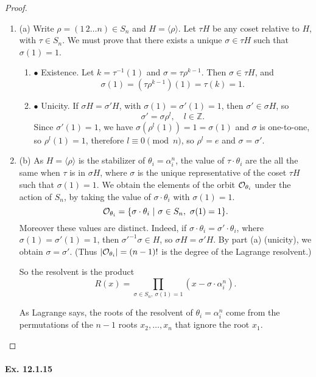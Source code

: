 \documentclass[11pt,a4paper]{article}
\newcommand{\be} {\begin{enumerate}}
\newcommand{\ee} {\end{enumerate}}
\newcommand{\Z}{\mathbb{Z}}
\begin{document}
\begin{proof}
\be
\item[(a)]
Write $\rho =  (1\, 2 \ldots n)  \in S_n$ and $H = \langle \rho \rangle$. Let $\tau H$ be any coset relative to $H$, with $\tau \in S_n$. We must prove that there exists a unique $\sigma \in \tau H$ such that $\sigma(1) = 1$.
	\be
	
	\item[$\bullet$] Existence.
	Let $k = \tau^{-1}(1)$ and $\sigma = \tau \rho^{k-1}$. Then $\sigma  \in \tau H$, and 
	$$\sigma(1) = (\tau \rho^{k-1})(1) = \tau(k) = 1.$$
	\item[$\bullet$] Unicity. If $\sigma H = \sigma' H$, with $\sigma(1) = \sigma'(1)=1$, then $\sigma' \in \sigma H$, so $$\sigma' = \sigma \rho^l, \quad l\in \Z.$$
	Since $\sigma'(1) = 1$, we have $\sigma(\rho^l(1)) = 1 = \sigma(1)$ and $\sigma$ is one-to-one, so $\rho^l(1) = 1$, therefore $l\equiv 0 \pmod n$, so $\rho^l =  e$ and $\sigma = \sigma'$.
	\ee
\item[(b)] As $H = \langle \rho \rangle$ is the stabilizer of $\theta_i = \alpha_i^n$, the value of $\tau \cdot \theta_i$ are the all the same when $\tau$ is in $\sigma H$, where $\sigma$ is the unique representative of the coset $\tau H$ such that $\sigma(1)=1$. We obtain the elements of the orbit ${\cal O}_{\theta_i}$  under the action of $S_n$, by taking the value of $\sigma \cdot \theta_i$ with $\sigma(1) = 1$. 
$${\cal O}_{\theta_i} = \{ \sigma \cdot \theta_i\ | \ \sigma \in S_n,\  \sigma(1)=1\}.$$
Moreover these values are distinct. Indeed, if $\sigma \cdot \theta_i = \sigma' \cdot \theta_i$, where $\sigma(1) = \sigma'(1) = 1$, then $\sigma'^{-1} \sigma \in H$, so $\sigma H = \sigma' H$. By part (a) (unicity), we obtain $\sigma = \sigma'$. (Thus $|{\cal O}_{\theta_i}| = (n-1)!$ is the degree of the Lagrange resolvent.)

So the resolvent is the product $$R(x) = \prod_{\sigma\in S_n,\ \sigma(1) = 1} (x - \sigma\cdot \alpha_i^n).$$

As Lagrange says,  the roots of the resolvent of $\theta_i =\alpha_i^n$ come from the permutations of the $n-1$ roots $x_2,\ldots,x_n$ that ignore the root $x_1$.
\ee
\end{proof}

\paragraph{Ex. 12.1.15}
\end{document}

